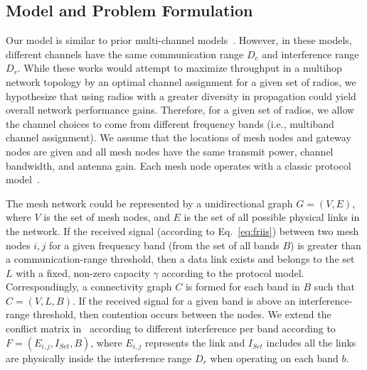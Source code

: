 
\subsection{Model and Problem Formulation}
\label{subsec:problem}

Our model is similar to prior multi-channel models~\cite{tang2005interference,
yuan2006cross,si2010overview}. However, in these models, different channels
have the same communication range $D_c$ and interference range $D_r$.  While
these works would attempt to maximize throughput in a multihop network topology
by an optimal channel assignment for a given set of radios, we hypothesize that
using radios with a greater diversity in propagation could yield overall network 
performance gains.  Therefore, for a given set of radios, we allow the channel
choices to come from different frequency bands (i.e., multiband channel assignment).
We assume that the locations of mesh nodes and gateway nodes are given and
all mesh nodes have the same transmit power, channel bandwidth, and antenna gain.
Each mesh node operates with a classic protocol model~\cite{gupta2000capacity}. 

The mesh network could be represented by a unidirectional graph $G=(V,E)$, where
$V$ is the set of mesh nodes, and $E$ is the set of all possible physical links 
in the network. If the received signal (according to Eq.~\ref{eq:friis}) between 
two mesh nodes $i,j$ for a given frequency band (from the set of all bands $B$) 
is greater than a communication-range threshold, then a data link exists and 
belongs to the set $L$ with a fixed, non-zero capacity $\gamma$ according to the protocol 
model.  Correspondingly, a connectivity graph $C$ is formed for each 
band in $B$ such that $C=(V,L,B)$.  If the received signal for a given band is 
above an interference-range threshold, then contention occurs between the
nodes.  We extend the conflict matrix in~\cite{tang2005interference} according to
different interference per band according to $F=(E_{i,j},I_{Set},B)$, where $E_{i,j}$
represents the link and $I_{Set}$ includes all the links are physically inside 
the interference range $D_r$ when operating on each band $b$.

